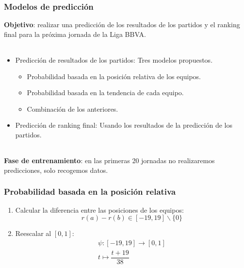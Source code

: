 \documentclass{beamer}
\newcounter{sauvegardeenumi}
\newcommand{\asuivre}{\setcounter{sauvegardeenumi}{\theenumi}}
\begin{document}
	\begin{frame}
		\frametitle{Modelos de predicción}
		\textbf{Objetivo}: realizar una predicción de los resultados de los partidos y el ranking final para la próxima jornada de la Liga BBVA.\\
		\ \\
		\begin{itemize}
			\item Predicción de resultados de los partidos: Tres modelos propuestos.
			\begin{itemize}
				\item Probabilidad basada en la posición relativa de los equipos.
				\item Probabilidad basada en la tendencia de cada equipo.
				\item Combinación de los anteriores.
			\end{itemize}
			\item Predicción de ranking final: Usando los resultados de la predicción de los partidos.
		\end{itemize} 
		\ \\
		\textbf{Fase de entrenamiento}: en las primeras 20 jornadas no realizaremos predicciones, solo recogemos datos.
	\end{frame}	
	
	\begin{frame}
		\frametitle{Probabilidad basada en la posición relativa}
		\begin{enumerate}
			\item Calcular la diferencia entre las posiciones de los equipos: 
			\begin{equation*}
				r(a)-r(b) \in [-19,19] \backslash \{0\}
			\end{equation*}
			\item Reescalar al $[0,1]$:
			\begin{eqnarray*}
				\psi: [-19,19] \longrightarrow [0,1] \\
				t \longmapsto \dfrac{t+19}{38}
			\end{eqnarray*}
			\asuivre
		\end{enumerate}
	\end{frame}
\end{document}
